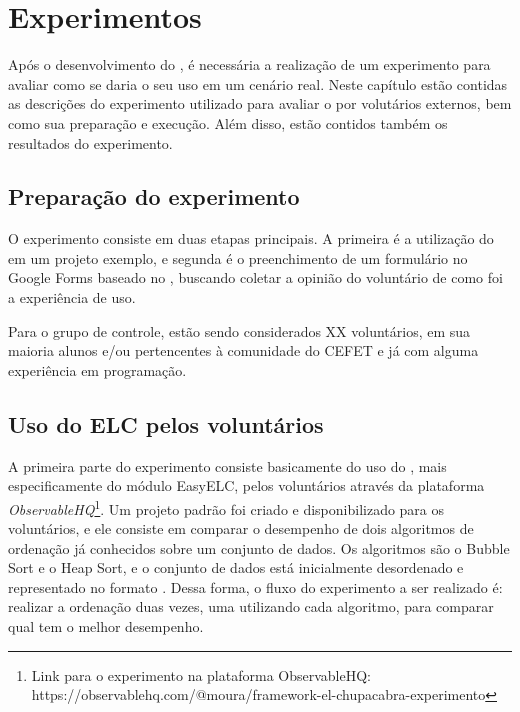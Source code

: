 \documentclass[12pt]{tcc}
\begin{document}
\chapter{Experimentos}
\label{cap:experimentos}

Após o desenvolvimento do , é necessária a realização de um experimento para avaliar como se daria o seu uso em um cenário real. Neste capítulo estão contidas as descrições do experimento utilizado para avaliar o  por volutários externos, bem como sua preparação e execução. Além disso, estão contidos também os resultados do experimento.

\section{Preparação do experimento}
\label{section:preparacao-experimento}

O experimento consiste em duas etapas principais. A primeira é a utilização do  em um projeto exemplo, e segunda é o preenchimento de um formulário no Google Forms baseado no , buscando coletar a opinião do voluntário de como foi a experiência de uso.

Para o grupo de controle, estão sendo considerados XX voluntários, em sua maioria alunos e/ou pertencentes à comunidade do CEFET e já com alguma experiência em programação. 


\section{Uso do ELC pelos voluntários}
\label{section:parte-1-experimento}




A primeira parte do experimento consiste basicamente do uso do , mais especificamente do módulo EasyELC, pelos voluntários através da plataforma \emph{ObservableHQ}\footnote{Link para o experimento na plataforma ObservableHQ: https://observablehq.com/@moura/framework-el-chupacabra-experimento}. Um projeto padrão foi criado e disponibilizado para os voluntários, e ele consiste em comparar o desempenho de dois algoritmos de ordenação já conhecidos sobre um conjunto de dados. Os algoritmos são o Bubble Sort e o Heap Sort, e o conjunto de dados está inicialmente desordenado e representado no formato . Dessa forma, o fluxo do experimento a ser realizado é: realizar a ordenação duas vezes, uma utilizando cada algoritmo, para comparar qual tem o melhor desempenho.
\end{document}
